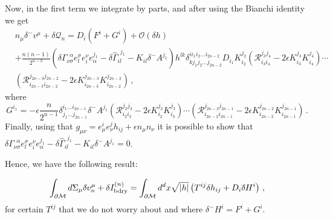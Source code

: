 \documentclass[11pt,letterpaper]{article}
\newcommand{\dslash}{\delta^{\!\!\!\!-}\!}
\begin{document}
Now, in the first term we integrate by parts, and after using the Bianchi identity we get
\begin{equation}
\begin{aligned}
&n_{\mu}\dslash  v^{\mu}+\delta \mathcal{Q}_n=D_i (F^i+G^i)+\mathcal{O}(\delta h)\\
&+\frac{n(n-1)}{2^{n-3}}\left(\delta \Gamma_{\nu\sigma}^{\ \ \alpha}e^{\sigma}_{l} e^{\nu}_{i}e_{\alpha}^{j_1}-\delta \hat\Gamma_{i l}^{\ \ j_1}-K_{i l}\dslash  A^{j_1}\right)h^{lk}\delta^{i i_1 i_2\dots i_{2n-2}}_{k j_1 j_2\dots j_{2n-2}}D_{i_1}K_{i_2}^{j_2}\left(\mathcal{R}^{j_3 j_4}_{i_3i_4}-2\epsilon K^{j_3}_{i_3}K^{j_4}_{i_4}\right)\cdots \\
&\left(\mathcal{R}^{j_{2n-3}j_{2n-2}}_{i_{2n-3}i_{2n-2}}-2\epsilon K^{j_{2n-3}}_{i_{2n-3}}K^{j_{2n-2}}_{i_{2n-2}}\right)\, ,
\end{aligned}
\end{equation}
where
\begin{equation}
G^{i_1}=-\epsilon\frac{n}{2^{n-1}}\delta^{i_1 \dots i_{2n-1}}_{j_1\dots j_{2n-1}} \dslash  A^{j_1}\left(\mathcal{R}^{j_2 j_3}_{i_2i_3}-2\epsilon K^{j_2}_{i_2}K^{j_3}_{i_3}\right)\cdots \left(\mathcal{R}^{j_{2n-2}j_{2n-1}}_{i_{2n-2}i_{2n-1}}-2\epsilon K^{j_{2n-2}}_{i_{2n-2}}K^{j_{2n-1}}_{i_{2n-1}}\right)\, .
\end{equation}
Finally, using that $g_{\mu\nu}=e_{\mu}^{i}e_{\nu}^{j}h_{ij}+\epsilon n_{\mu}n_{\nu}$ it is possible to show that $\delta \Gamma_{\nu\sigma}^{\ \ \alpha}e^{\sigma}_{l} e^{\nu}_{i}e_{\alpha}^{j_1}-\delta \hat\Gamma_{i l}^{\ \ j_1}-K_{i l}\dslash  A^{j_1}=0$. 

Hence, we have the following result:

\begin{equation}
\int_{\partial \mathcal{M}} d\Sigma_{\mu}\dslash v^{\mu}_{n}+  \delta I_{\rm bdry}^{(n)}=\int_{\partial\mathcal{M}} d^{d}x\sqrt{|h|}\left( T^{ij}\delta h_{ij}+D_i \dslash H^i\right)\, ,
\end{equation}
for certain $T^{ij}$ that we do not worry about and where $\dslash  H^i=F^i+G^i$. 
\end{document}

